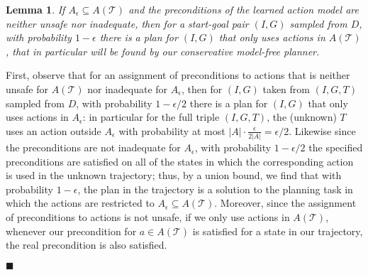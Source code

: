 \documentclass[letterpaper]{article}
\newtheorem{lemma}{Lemma}
\def\sFullBox{\hbox{\vrule width 6pt height 6pt depth 0pt}}
\newcommand{\qqed}{\(\;\;\;\sFullBox\)}
\newenvironment{proof}{\noindent{\bf Proof:~~}}{\qed}
\newenvironment{proof-of-claim}{\noindent{\bf Proof:~~}}{\qqed}
\newcommand{\qed}{\hfill\ensuremath{\blacksquare}}
\begin{document}
\begin{proof}
\begin{lemma}
If $A_\epsilon\subseteq A(\mathcal{T})$ and the preconditions of the learned action model are neither unsafe nor inadequate, then for a start-goal pair $(I,G)$ sampled from $D$, with probability $1-\epsilon$ there is a plan for $(I,G)$ that only uses actions in $A(\mathcal{T})$, that in particular will be found by our conservative model-free planner.
\label{lem:plan-existance}
\end{lemma}
\begin{proof-of-claim}
First, observe that for an assignment of preconditions to actions that is neither unsafe for $A(\mathcal{T})$ nor inadequate for $A_\epsilon$, then for $(I,G)$ taken from $(I,G,T)$ sampled from $D$, with probability $1-\epsilon/2$ there is a plan for $(I,G)$ that only uses actions in $A_\epsilon$: in particular for the full triple $(I,G,T)$, the (unknown) $T$ uses an action outside $A_\epsilon$ with probability at most $|A|\cdot\frac{\epsilon}{2|A|}=\epsilon/2$.
Likewise since the preconditions are not inadequate for $A_\epsilon$, with probability $1-\epsilon/2$ the specified preconditions are satisfied on all of the states in which the corresponding action is used in the unknown trajectory; thus, by a union bound, we find that with probability $1-\epsilon$, the plan in the trajectory is a solution to the planning task in which the actions are restricted to $A_\epsilon\subseteq A(\mathcal{T})$.
Moreover, since the assignment of preconditions to actions is not unsafe, if we only use actions in $A(\mathcal{T})$, whenever our precondition for $a\in A(\mathcal{T})$ is satisfied for a state in our trajectory, the real precondition is also satisfied. 
\end{proof-of-claim}



\end{proof}
\end{document}
